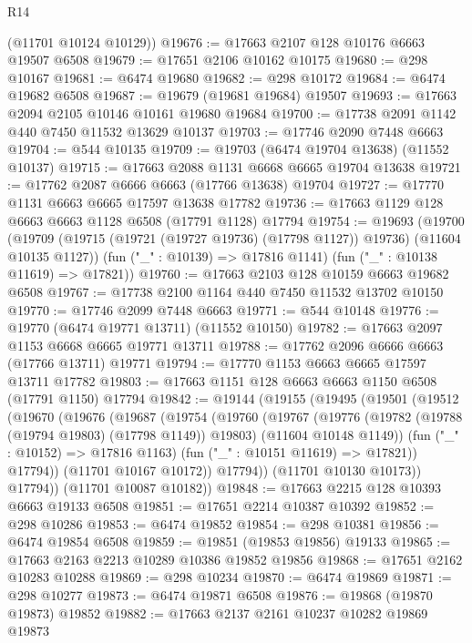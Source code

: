\begin{lexlean}{R14}
\begin{coremodule}
{{{{{{{{{{{{{{{{{{{{{{{{{{{{{{{{{{{{{{{{{{{{{{{{{{{{{{{{{{{{{{{{{{{{{{{{{{{{{{{{{{      (@11701 @10124 @10129))
@19676 := @17663 @2107 @128 @10176 @6663 @19507 @6508
@19679 := @17651 @2106 @10162 @10175
@19680 := @298 @10167
@19681 := @6474 @19680
@19682 := @298 @10172
@19684 := @6474 @19682 @6508
@19687 := @19679 (@19681 @19684) @19507
@19693 := @17663 @2094 @2105 @10146 @10161 @19680 @19684
@19700 := @17738 @2091 @1142 @440 @7450 @11532 @13629 @10137
@19703 := @17746 @2090 @7448 @6663
@19704 := @544 @10135
@19709 := @19703 (@6474 @19704 @13638) (@11552 @10137)
@19715 := @17663 @2088 @1131 @6668 @6665 @19704 @13638
@19721 := @17762 @2087 @6666 @6663 (@17766 @13638) @19704
@19727 := @17770 @1131 @6663 @6665 @17597 @13638 @17782
@19736 := @17663 @1129 @128 @6663 @6663 @1128 @6508 (@17791 @1128) @17794
@19754 := @19693
    (@19700
      (@19709 (@19715 (@19721 (@19727 @19736) (@17798 @1127)) @19736) (@11604 @10135 @1127))
      (fun ("_" : @10139) => @17816 @1141)
      (fun ("_" : @10138 @11619) => @17821))
@19760 := @17663 @2103 @128 @10159 @6663 @19682 @6508
@19767 := @17738 @2100 @1164 @440 @7450 @11532 @13702 @10150
@19770 := @17746 @2099 @7448 @6663
@19771 := @544 @10148
@19776 := @19770 (@6474 @19771 @13711) (@11552 @10150)
@19782 := @17663 @2097 @1153 @6668 @6665 @19771 @13711
@19788 := @17762 @2096 @6666 @6663 (@17766 @13711) @19771
@19794 := @17770 @1153 @6663 @6665 @17597 @13711 @17782
@19803 := @17663 @1151 @128 @6663 @6663 @1150 @6508 (@17791 @1150) @17794
@19842 := @19144
    (@19155
      (@19495
        (@19501
          (@19512
            (@19670
              (@19676
                (@19687
                  (@19754
                    (@19760
                      (@19767
                        (@19776
                          (@19782 (@19788 (@19794 @19803) (@17798 @1149)) @19803)
                          (@11604 @10148 @1149))
                        (fun ("_" : @10152) => @17816 @1163)
                        (fun ("_" : @10151 @11619) => @17821))
                      @17794))
                  (@11701 @10167 @10172))
                @17794))
            (@11701 @10130 @10173))
          @17794))
      (@11701 @10087 @10182))
@19848 := @17663 @2215 @128 @10393 @6663 @19133 @6508
@19851 := @17651 @2214 @10387 @10392
@19852 := @298 @10286
@19853 := @6474 @19852
@19854 := @298 @10381
@19856 := @6474 @19854 @6508
@19859 := @19851 (@19853 @19856) @19133
@19865 := @17663 @2163 @2213 @10289 @10386 @19852 @19856
@19868 := @17651 @2162 @10283 @10288
@19869 := @298 @10234
@19870 := @6474 @19869
@19871 := @298 @10277
@19873 := @6474 @19871 @6508
@19876 := @19868 (@19870 @19873) @19852
@19882 := @17663 @2137 @2161 @10237 @10282 @19869 @19873
}}}}}}}}}}}}}}}}}}}}}}}}}}}}}}}}}}}}}}}}}}}}}}}}}}}}}}}}}}}}}}}}}}}}}}}}}}}}}}}}}}
\end{coremodule}
\end{lexlean}
